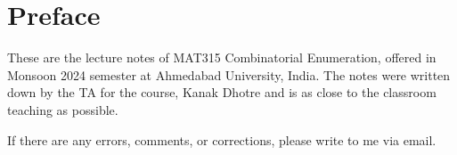 %

\chapter*{Preface}

These are the lecture notes of MAT315 Combinatorial Enumeration, offered in Monsoon 2024 semester at Ahmedabad University, India. The notes were written down by the TA for the course, Kanak Dhotre and is as close to the classroom teaching as possible.

If there are any errors, comments, or corrections, please write to me via email.


